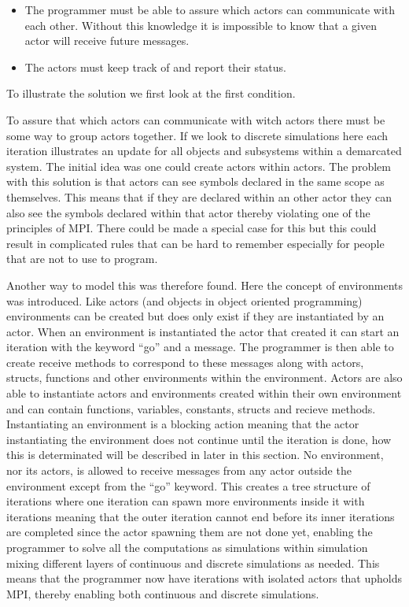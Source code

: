 \begin{itemize}
\item The programmer must be able to assure which actors can communicate with each other. Without this knowledge it is impossible to know that a given actor will receive future messages.
\item The actors must keep track of and report their status.
\end{itemize} 

To illustrate the solution we first look at the first condition.

To assure that which actors can communicate with witch actors there must be some way to group actors together. If we look to discrete simulations here each iteration illustrates an update for all objects and subsystems within a demarcated system. The initial idea was one could create actors within actors. The problem with this solution is that actors can see symbols declared in the same scope as themselves. This means that if they are declared within an other actor they can also see the symbols declared within that actor thereby violating one of the principles of MPI. There could be made a special case for this but this could result in complicated rules that can be hard to remember especially for people that are not to use to program.

Another way to model this was therefore found. Here the concept of environments was introduced. Like actors (and objects in object oriented programming) environments can be created but does only exist if they are instantiated by an actor. When an environment is instantiated the actor that created it can start an iteration with the keyword \enquote{go} and a message. The programmer is then able to create receive methods to correspond to these messages along with actors, structs, functions and other environments within the environment. Actors are also able to instantiate actors and environments created within their own environment and can contain functions, variables, constants, structs and recieve methods. Instantiating an environment is a blocking action meaning that the actor instantiating the environment does not continue until the iteration is done, how this is determinated will be described in later in this section. No environment, nor its actors, is allowed to receive messages from any actor outside the environment except from the \enquote{go} keyword. This creates a tree structure of iterations where one iteration can spawn more environments inside it with iterations meaning that the outer iteration cannot end before its inner iterations are completed since the actor spawning them are not done yet, enabling the programmer to solve all the computations as simulations within simulation mixing different layers of continuous and discrete simulations as needed. This means that the programmer now have iterations with isolated actors that upholds MPI, thereby enabling both continuous and discrete simulations.

